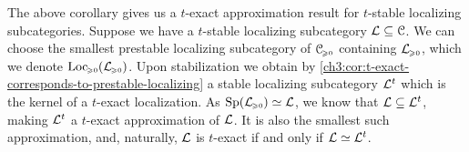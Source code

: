 

\begin{remark}
    \label{ch3:rm:t-exact-approximation}
    The above corollary gives us a $t$-exact approximation result for $t$-stable localizing subcategories. Suppose we have a $t$-stable localizing subcategory $\mathcal{L}\subseteq \EuScript{C}$. We can choose the smallest prestable localizing subcategory of $\EuScript{C}_{\hspace{-1pt}\scriptscriptstyle\geqslant 0}$ containing $\mathcal{L}_{\hspace{-1pt}\scriptscriptstyle\geqslant 0}$, which we denote $\operatorname{Loc}_{\hspace{-1pt}\scriptscriptstyle\geqslant 0}(\mathcal{L}_{\hspace{-1pt}\scriptscriptstyle\geqslant 0})$. Upon stabilization we obtain by \cref{ch3:cor:t-exact-corresponds-to-prestable-localizing} a stable localizing subcategory $\mathcal{L}^t$ which is the kernel of a $t$-exact localization. As $\mathrm{Sp}(\mathcal{L}_{\hspace{-1pt}\scriptscriptstyle\geqslant 0})\simeq \mathcal{L}$, we know that $\mathcal{L}\subseteq \mathcal{L}^t$, making $\mathcal{L}^t$ a $t$-exact approximation of $\mathcal{L}$. It is also the smallest such approximation, and, naturally, $\mathcal{L}$ is $t$-exact if and only if $\mathcal{L}\simeq \mathcal{L}^t$. 
\end{remark}




